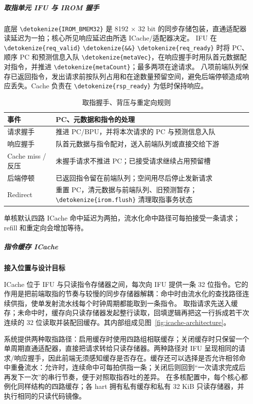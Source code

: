 \documentclass[UTF8,a4paper,12pt,fontset=none,scheme=plain]{ctexart}
\newcommand{\code}[1]{\texttt{\detokenize{#1}}}
\renewcommand{\code}[1]{{\small\ttfamily\urlstyle{tt}\expandafter\nolinkurl\expandafter{\detokenize{#1}}}}
\begin{document}
\subparagraph{取指单元 IFU 与 IROM 握手}

底层 \code{IROM_BMEM32} 是 8192 $\times$ 32 bit 的同步存储包装，直通适配器读延迟为一拍；核心所见响应延迟由所选 ICache/适配器决定。
IFU 在 \code{req_valid} \code{&&} \code{req_ready} 时将 PC、顺序 PC 和预测信息入队 \code{metaVec}，在响应握手时用队首元数据配对指令，并推进 \code{metaCount}；最多两项在途请求。
八项前端队列保存已返回指令，发出请求前按队列占用和在途数量预留空间，避免后端停顿造成响应丢失。Cache 负责在 \code{rsp_ready} 为低时保持响应。

\begin{table}[H]
\centering
\caption{取指握手、背压与重定向规则}
\label{tab:frontend-timing}
\begin{tabularx}{\linewidth}{@{}P{3.3cm}X@{}}
\toprule
事件 & PC、元数据和指令的处理 \\
\midrule
请求握手 & 推进 PC/BPU，并将本次请求的 PC 与预测信息入队 \\
响应握手 & 队首元数据与指令配对，送入前端队列或直接交给下游 \\
Cache miss / 反压 & 未握手请求不推进 PC；已接受请求继续占用预留槽 \\
后端停顿 & 已返回指令留在前端队列；空间用尽后停止发新请求 \\
Redirect & 重置 PC，清元数据与前端队列、旧预测暂存；\code{irom.flush} 清理取指事务状态 \\
\bottomrule
\end{tabularx}
\end{table}

单核默认四路 ICache 命中延迟为两拍，流水化命中路径可每拍接受一条请求；refill 和重定向会增加等待。

\subparagraph{指令缓存 ICache}
\label{subsec:icache-design}

\medskip
\noindent\textbf{接入位置与设计目标}\par

ICache 位于 IFU 与只读指令存储器之间，每次向 IFU 提供一条 32 位指令。它的作用是把前端取指的节奏与较慢的同步存储器解耦：命中时由流水化的查找路径连续供指，使单发射流水线每个时钟周期都能取到一条指令。
取指请求先送入缓存；未命中时，缓存向只读存储器发起整行读取，回填逻辑再把这一行拆成若干次连续的 32 位读取并装配回缓存。其内部组成见图~\ref{fig:icache-architecture}。

系统提供两种取指路径：启用缓存时使用四路组相联缓存；关闭缓存时只保留一个单周期直通适配器，直接把请求转给只读存储器。两种路径对 IFU 呈现相同的请求/响应握手，因此前端无须感知缓存是否存在。缓存还可以选择是否允许相邻命中重叠流水：允许时，连续命中可每拍供指一条；关闭后则回到“一次请求完成后再发下一次”的串行节奏，便于对照取指吞吐的差异。
在多核配置中，每个核心都例化同样结构的四路缓存；各 hart 拥有私有缓存和私有 32 KiB 只读存储器，并执行相同的只读代码镜像。
\end{document}

